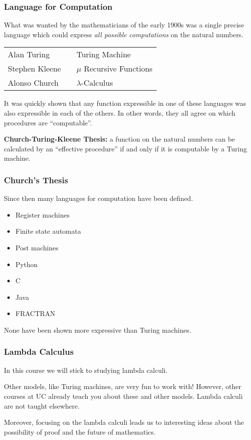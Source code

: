 \documentclass{beamer}
\begin{document}
\begin{frame}
	\frametitle{Language for Computation}
	What was wanted by the mathematicians of the early 1900s was a single precise language which could express \emph{all possible computations} on the natural numbers.
	
	
	\begin{center}
		\begin{tabular}{l c l}
			Alan Turing & & Turing Machine \\
			Stephen Kleene & & $\mu$ Recursive Functions \\
			Alonso Church & & $\lambda$-Calculus
		\end{tabular}
	\end{center}

	It was quickly shown that any function expressible in one of these languages was also expressible in each of the others. In other words, they all agree on which procedures are ``computable''. 

	{\bf Church-Turing-Kleene Thesis:} a function on the natural numbers can be calculated by an ``effective procedure'' if and only if it is computable by a Turing machine. 
\end{frame}

\begin{frame}
	\frametitle{Church's Thesis}

	Since then many languages for computation have been defined. 

	\begin{itemize}
		\item Register machines
		\item Finite state automata
		\item Post machines
		\item Python
		\item C
		\item Java
		\item FRACTRAN
	\end{itemize}

	None have been shown more expressive than Turing machines.
\end{frame}

\begin{frame}
	\frametitle{Lambda Calculus}

	In this course we will stick to studying lambda calculi. 

	Other models, like Turing machines, are very fun to work with! However, other courses at UC already teach you about these and other models. Lambda calculi are not taught elsewhere. 

	Moreover, focusing on the lambda calculi leads us to interesting ideas about the possibility of proof and the future of mathematics. 

\end{frame}
\end{document}
